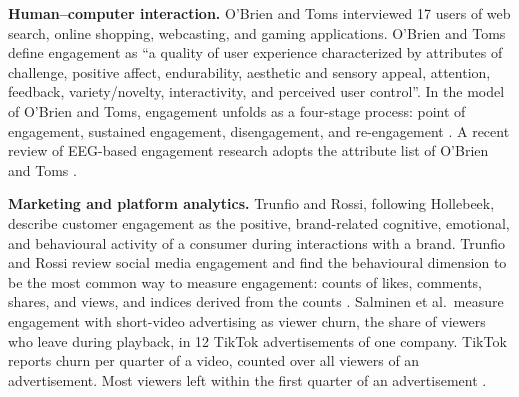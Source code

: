 \documentclass[12pt,a4paper]{report}
\begin{document}
\textbf{Human--computer interaction.} O'Brien and Toms interviewed 17 users of web search, online shopping, webcasting, and gaming applications. O'Brien and Toms define engagement as ``a quality of user experience characterized by attributes of challenge, positive affect, endurability, aesthetic and sensory appeal, attention, feedback, variety/novelty, interactivity, and perceived user control''. In the model of O'Brien and Toms, engagement unfolds as a four-stage process: point of engagement, sustained engagement, disengagement, and re-engagement \cite{obrien_what_2008}. A recent review of EEG-based engagement research adopts the attribute list of O'Brien and Toms \cite{bellos_methods_2025}.

\textbf{Marketing and platform analytics.} Trunfio and Rossi, following Hollebeek, describe customer engagement as the positive, brand-related cognitive, emotional, and behavioural activity of a consumer during interactions with a brand. Trunfio and Rossi review social media engagement and find the behavioural dimension to be the most common way to measure engagement: counts of likes, comments, shares, and views, and indices derived from the counts \cite{trunfio_conceptualising_2021}. Salminen et al.\ measure engagement with short-video advertising as viewer churn, the share of viewers who leave during playback, in 12 TikTok advertisements of one company. TikTok reports churn per quarter of a video, counted over all viewers of an advertisement. Most viewers left within the first quarter of an advertisement \cite{salminen_engagement_2024}.
\end{document}
